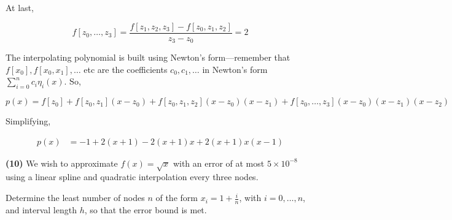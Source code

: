 \documentclass[12pt]{article}
\theoremstyle{definition}
\begin{document}
At last, 

\begin{equation*}
    f[z_0, \ldots, z_3] = \frac{f[z_1, z_2, z_3] - f[z_0, z_1, z_2]}{z_3 - z_0}
    = 2
\end{equation*}

The interpolating polynomial is built using Newton's form---remember that
$f[x_0], f[x_0,x_1], \ldots$ etc are the coefficients $c_0, c_1, \ldots$ in
Newton's form $\sum_{i=0}^n c_i \eta_i(x)$. So,

\begin{equation*}
    p(x) = f[z_0] + f[z_0, z_1](x-z_0) + f[z_{0}, z_1, z_2](x-z_0)(x-z_1) +
    f[z_0,\ldots, z_3](x-z_0)(x-z_1)(x-z_2)
\end{equation*}

Simplifying,

\begin{align*}
    p(x) 
    &= -1 +2(x+1) -2 (x+1)x + 2(x+1)x(x-1)
\end{align*}


\pagebreak 

\begin{shaded}
    \textbf{(10)} We wish to approximate $f(x) = \sqrt{x} $ with an error of at
    most $5 \times 10^{-8}$ using a linear spline and quadratic interpolation
    every three nodes. 

    Determine the least number of nodes $n$ of the form $x_i = 1 + \frac{i}{n}$,
    with $i = 0, \ldots, n$, and interval length $h$, so that the error bound is
    met.
\end{shaded}
\end{document}
